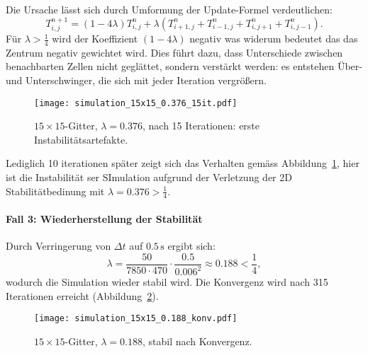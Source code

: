 Die Ursache lässt sich durch Umformung der Update-Formel verdeutlichen:
\begin{equation}
	T_{i,j}^{n+1}
	=
	(1-4\lambda)T_{i,j}^n +
	\lambda \left(
	T_{i+1,j}^n + T_{i-1,j}^n + T_{i,j+1}^n + T_{i,j-1}^n
	\right).
\end{equation}
Für \(\lambda > \tfrac14\) wird der Koeffizient \((1-4\lambda)\) negativ was widerum bedeutet das das Zentrum negativ gewichtet wird.  
Dies führt dazu, dass Unterschiede zwischen benachbarten Zellen nicht geglättet, sondern verstärkt werden: es entstehen Über- und Unterschwinger, die sich mit jeder Iteration vergrößern.

\begin{figure}[htbp]
	\centering
	\texttt{[image: simulation\_15x15\_0.376\_15it.pdf]}
	\caption{\(15\times 15\)-Gitter, \(\lambda = 0.376\), nach 15 Iterationen: erste Instabilitätsartefakte.}
	\label{parallelisierung:fig:simulation_15x15_0.376_15it}
\end{figure}

Lediglich 10 iterationen später zeigt sich das Verhalten gemäss Abbildung~\ref{parallelisierung:fig:simulation_15x15_0.376_15it}, hier ist die Instabilität ser SImulation aufgrund der Verletzung der 2D Stabilitätbedinung mit \(\lambda = 0.376 > \frac{1}{4}\).

\paragraph{Fall 3: Wiederherstellung der Stabilität}  
Durch Verringerung von \(\Delta t\) auf \(0.5\,\mathrm{s}\) ergibt sich:
\[
\lambda =
\frac{50}{7850 \cdot 470} \cdot \frac{0.5}{0.006^2}
\approx 0.188 < \frac14,
\]
wodurch die Simulation wieder stabil wird. Die Konvergenz wird nach 315 Iterationen erreicht (Abbildung~\ref{parallelisierung:fig:simulation_15x15_0.188_konv}).

\begin{figure}[htbp]
	\centering
	\texttt{[image: simulation\_15x15\_0.188\_konv.pdf]}
	\caption{\(15\times 15\)-Gitter, \(\lambda = 0.188\), stabil nach Konvergenz.}
	\label{parallelisierung:fig:simulation_15x15_0.188_konv}
\end{figure}


